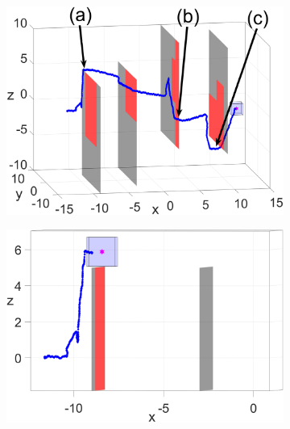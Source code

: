 \begin{figure}
	\centering
	\begin{subfigure}[t]{0.49\columnwidth} \label{subfig:sim_4}
		\includegraphics[width=\columnwidth]{fig/1173}
	\end{subfigure}  
	\begin{subfigure}[t]{0.49\columnwidth} \label{subfig:sim_1}
		\includegraphics[width=\columnwidth]{fig/224}
		\caption{}
	\end{subfigure}
	

\end{figure}
